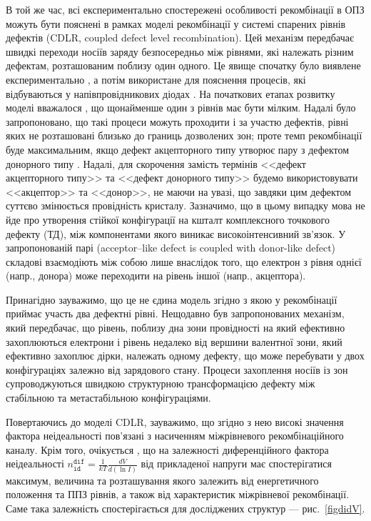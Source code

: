 В той же час, всі експериментально спостережені особливості рекомбінації в ОПЗ можуть бути пояснені в рамках
моделі рекомбінації у системі спарених рівнів дефектів (CDLR, coupled defect level recombination).
Цей механізм передбачає швидкі переходи носіїв заряду безпосередньо між рівнями, які належать різним дефектам,
розташованим поблизу один одного.
Це явище спочатку було виявлене експериментально \cite{DAPR:Chen1991,DAPR:Chen1994},
а потім використане для пояснення процесів, які відбуваються у напівпровідникових діодах \cite{CDLR:JAP1995,CDLR:JAP,CDLR:SSP,Breitenstein2013,CDLR:SupMicr}.
На початкових етапах розвитку моделі вважалося \cite{CDLR:JAP1995}, що щонайменше один з рівнів має бути
мілким.
Надалі було запропоновано, що такі процеси можуть проходити і за участю дефектів, рівні яких не розташовані близько до границь дозволених зон;
проте темп рекомбінації буде максимальним, якщо дефект акцепторного типу утворює пару з дефектом донорного типу \cite{CDLR:JAP}.
Надалі, для скорочення замість термінів <<дефект акцепторного типу>> та <<дефект донорного типу>>
будемо використовувати <<акцептор>> та <<донор>>, не маючи на увазі, що завдяки цим дефектом суттєво змінюється провідність кристалу.
Зазначимо, що в цьому випадку мова не йде про утворення стійкої конфігурації на кшталт комплексного точкового дефекту (ТД),
між компонентами якого виникає високоінтенсивний зв'язок.
У запропонованій парі (acceptor--like defect is coupled with donor-like defect) складові взаємодіють
між собою лише внаслідок того, що електрон з рівня однієї (напр., донора) може переходити на рівень іншої (напр., акцептора).

Принагідно зауважимо, що це не єдина модель згідно з якою у рекомбінації приймає участь два
дефектні рівні.
Нещодавно \cite{TwoLevelRecomb} був запропонованих механізм, який передбачає, що рівень, поблизу дна зони провідності
на який ефективно захоплюються електрони і рівень недалеко від вершини валентної зони, який ефективно захоплює дірки,
належать одному дефекту, що може перебувати у двох конфігураціях залежно від зарядового стану.
Процеси захоплення носіїв із зон супроводжуються швидкою структурною трансформацією дефекту між стабільною та метастабільною конфігураціями.

Повертаючись до моделі CDLR,
зауважимо, що згідно з нею високі значення фактора неідеальності пов'язані з насиченням
міжрівневого рекомбінаційного каналу.
Крім того, очікується \cite{CDLR:JAP,Breitenstein2013}, що
на залежності диференційного фактора неідеальності
$n_\mathtt{id}^\mathtt{dif}=\frac{1}{kT}\frac{dV}{d(\ln I)}$ від прикладеної напруги має
спостерігатися максимум, величина та розташування якого залежить від енергетичного положення та
ППЗ рівнів, а також від характеристик міжрівневої рекомбінації.
Саме така залежність спостерігається для досліджених структур --- рис.~\ref{figdidV}.

